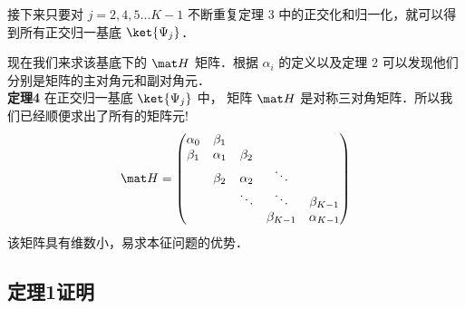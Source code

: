 接下来只要对 $j = 2,4,5...K - 1$ 不断重复定理 3 中的正交化和归一化，就可以得到所有正交归一基底 $\ket{\Psi _j} $．

现在我们来求该基底下的 $\mat H$ 矩阵．根据 $\alpha_i$ 的定义以及定理 2 可以发现他们分别是矩阵的主对角元和副对角元．\\

{\noindent \textbf{定理4}}
在正交归一基底 $\ket{\Psi _j}$ 中， 矩阵 $\mat H$ 是对称三对角矩阵．所以我们已经顺便求出了所有的矩阵元!
\begin{equation}
\mat H =
\begin{pmatrix}
\alpha _0 & \beta _1 &&& \\ 
\beta _1 & \alpha _1 & \beta _2 && \\ 
 & \beta _2 & \alpha _2 & \ddots&  \\ 
& & \ddots& \ddots & {\beta _{K - 1}} \\
&&&\beta_{K - 1} &{\alpha _{K - 1}}
\end{pmatrix}\end{equation}
该矩阵具有维数小，易求本征问题的优势．


\subsection{定理1证明}


